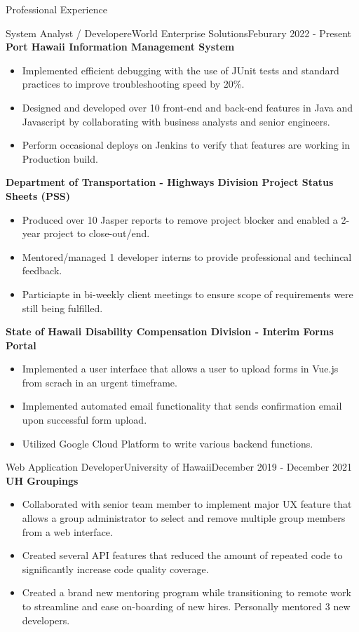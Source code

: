 \documentclass[]{mcdowellcv}
\begin{document}
	\makeheader

	\begin{cvsection}{Professional Experience}
		\begin{cvsubsection}{System Analyst / Developer}{eWorld Enterprise Solutions}{Feburary 2022 - Present}
			\textbf{Port Hawaii Information Management System}
			\begin{itemize}
				\item Implemented efficient debugging with the use of JUnit tests and standard practices to improve troubleshooting speed by 20\%.
				\item Designed and developed over 10 front-end and back-end features in Java and Javascript by collaborating with business analysts and senior engineers.
				\item Perform occasional deploys on Jenkins to verify that features are working in Production build.
			\end{itemize}
			\textbf{Department of Transportation - Highways Division Project Status Sheets (PSS)}
			\begin{itemize}
				\item Produced over 10 Jasper reports to remove project blocker and enabled a 2-year project to close-out/end.
				\item Mentored/managed 1 developer interns to provide professional and techincal feedback.
				\item Particiapte in bi-weekly client meetings to ensure scope of requirements were still being fulfilled. 
			\end{itemize}
			\textbf{State of Hawaii Disability Compensation Division - Interim Forms Portal}
			\begin{itemize}
				\item Implemented a user interface that allows a user to upload forms in Vue.js from scrach in an urgent timeframe.
				\item Implemented automated email functionality that sends confirmation email upon successful form upload.
				\item Utilized Google Cloud Platform to write various backend functions.
			\end{itemize}
		\end{cvsubsection}
	\begin{cvsubsection}{Web Application Developer}{University of Hawaii}{December 2019 - December 2021}
			\textbf{UH Groupings}
			\begin{itemize}
				\item Collaborated with senior team member to implement major UX feature that allows a group administrator to select and remove multiple group members from a web interface.
				\item Created several API features that reduced the amount of repeated code to significantly increase code quality coverage.
				\item Created a brand new mentoring program while transitioning to remote work to streamline and ease on-boarding of new hires. Personally mentored 3 new developers.
			\end{itemize}
		\end{cvsubsection}
	\end{cvsection}
		
\end{document}
